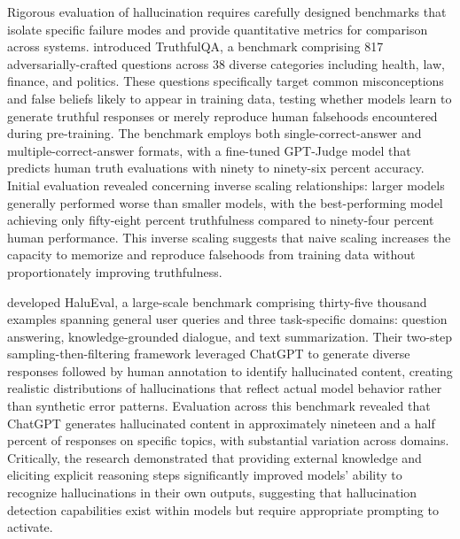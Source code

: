 \documentclass[11pt,letterpaper]{article}
\begin{document}
Rigorous evaluation of hallucination requires carefully designed benchmarks that isolate specific failure modes and provide quantitative metrics for comparison across systems. \cite{lin2022truthfulqa} introduced TruthfulQA, a benchmark comprising 817 adversarially-crafted questions across 38 diverse categories including health, law, finance, and politics. These questions specifically target common misconceptions and false beliefs likely to appear in training data, testing whether models learn to generate truthful responses or merely reproduce human falsehoods encountered during pre-training. The benchmark employs both single-correct-answer and multiple-correct-answer formats, with a fine-tuned GPT-Judge model that predicts human truth evaluations with ninety to ninety-six percent accuracy. Initial evaluation revealed concerning inverse scaling relationships: larger models generally performed worse than smaller models, with the best-performing model achieving only fifty-eight percent truthfulness compared to ninety-four percent human performance. This inverse scaling suggests that naive scaling increases the capacity to memorize and reproduce falsehoods from training data without proportionately improving truthfulness.

\cite{li2023halueval} developed HaluEval, a large-scale benchmark comprising thirty-five thousand examples spanning general user queries and three task-specific domains: question answering, knowledge-grounded dialogue, and text summarization. Their two-step sampling-then-filtering framework leveraged ChatGPT to generate diverse responses followed by human annotation to identify hallucinated content, creating realistic distributions of hallucinations that reflect actual model behavior rather than synthetic error patterns. Evaluation across this benchmark revealed that ChatGPT generates hallucinated content in approximately nineteen and a half percent of responses on specific topics, with substantial variation across domains. Critically, the research demonstrated that providing external knowledge and eliciting explicit reasoning steps significantly improved models' ability to recognize hallucinations in their own outputs, suggesting that hallucination detection capabilities exist within models but require appropriate prompting to activate.
\end{document}
